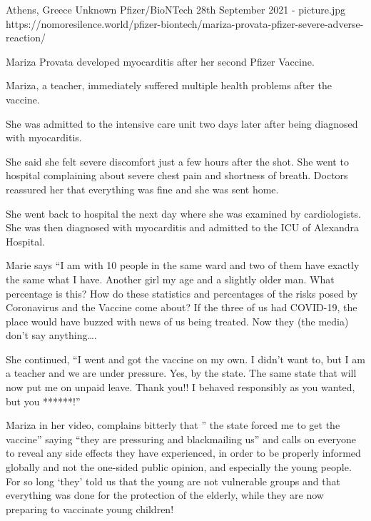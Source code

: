 {Athens, Greece}
{Unknown}
{Pfizer/BioNTech}
{28th September 2021}
{-}
{picture.jpg}
{https://nomoresilence.world/pfizer-biontech/mariza-provata-pfizer-severe-adverse-reaction/}
{

Mariza Provata developed myocarditis after her second Pfizer Vaccine.

Mariza, a teacher, immediately suffered multiple health problems after the vaccine.

She was admitted to the intensive care unit two days later after being diagnosed with myocarditis.

She said she felt severe discomfort just a few hours after the shot. She went to hospital complaining about severe chest pain and shortness of breath. Doctors reassured her that everything was fine and she was sent home.

She went back to hospital the next day where she was examined by cardiologists. She was then diagnosed with myocarditis and admitted to the ICU of Alexandra Hospital.

Marie says “I am with 10 people in the same ward and two of them have exactly the same what I have. Another girl my age and a slightly older man. What percentage is this? How do these statistics and percentages of the risks posed by Coronavirus and the Vaccine come about? If the three of us had COVID-19, the place would have buzzed with news of us being treated. Now they (the media) don’t say anything….

She continued, “I went and got the vaccine on my own. I didn’t want to, but I am a teacher and we are under pressure. Yes, by the state. The same state that will now put me on unpaid leave. Thank you!! I behaved responsibly as you wanted, but you ******!”

Mariza in her video, complains bitterly that ” the state forced me to get the vaccine” saying “they are pressuring and blackmailing us” and calls on everyone to reveal any side effects they have experienced, in order to be properly informed globally and not the one-sided public opinion, and especially the young people. For so long ‘they’ told us that the young are not vulnerable groups and that everything was done for the protection of the elderly, while they are now preparing to vaccinate young children!
}
